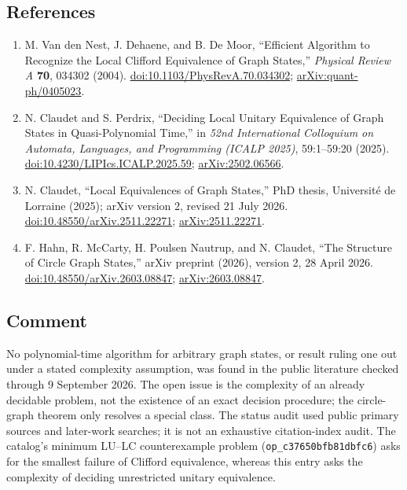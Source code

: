 \subsection*{References}

\begin{enumerate}[label={},leftmargin=4.8em,labelsep=0.5em]
  \footnotesize
  \item[\textup{[VDD04]}]\label{ref:glu-lc}
  M. Van den Nest, J. Dehaene, and B. De Moor, ``Efficient Algorithm to Recognize the Local Clifford Equivalence of Graph States,'' \emph{Physical Review A} \textbf{70}, 034302 (2004). \href{https://doi.org/10.1103/PhysRevA.70.034302}{doi:10.1103/PhysRevA.70.034302}; \href{https://arxiv.org/abs/quant-ph/0405023}{arXiv:quant-ph/0405023}.

  \item[\textup{[CP25]}]\label{ref:glu-quasipolynomial}
  N. Claudet and S. Perdrix, ``Deciding Local Unitary Equivalence of Graph States in Quasi-Polynomial Time,'' in \emph{52nd International Colloquium on Automata, Languages, and Programming (ICALP 2025)}, 59:1–59:20 (2025). \href{https://doi.org/10.4230/LIPIcs.ICALP.2025.59}{doi:10.4230/LIPIcs.ICALP.2025.59}; \href{https://arxiv.org/abs/2502.06566}{arXiv:2502.06566}.

  \item[\textup{[Cla25]}]\label{ref:glu-thesis}
  N. Claudet, ``Local Equivalences of Graph States,'' PhD thesis, Université de Lorraine (2025); arXiv version 2, revised 21 July 2026. \href{https://doi.org/10.48550/arXiv.2511.22271}{doi:10.48550/arXiv.2511.22271}; \href{https://arxiv.org/abs/2511.22271}{arXiv:2511.22271}.

  \item[\textup{[HMNC26]}]\label{ref:glu-circle}
  F. Hahn, R. McCarty, H. Poulsen Nautrup, and N. Claudet, ``The Structure of Circle Graph States,'' arXiv preprint (2026), version 2, 28 April 2026. \href{https://doi.org/10.48550/arXiv.2603.08847}{doi:10.48550/arXiv.2603.08847}; \href{https://arxiv.org/abs/2603.08847}{arXiv:2603.08847}.
\end{enumerate}

\subsection*{Comment}

No polynomial-time algorithm for arbitrary graph states, or result ruling one out under a stated complexity assumption, was found in the public literature checked through 9 September 2026. The open issue is the complexity of an already decidable problem, not the existence of an exact decision procedure; the circle-graph theorem only resolves a special class. The status audit used public primary sources and later-work searches; it is not an exhaustive citation-index audit. The catalog's minimum LU--LC counterexample problem (\texttt{op\_c37650bfb81dbfc6}) asks for the smallest failure of Clifford equivalence, whereas this entry asks the complexity of deciding unrestricted unitary equivalence.

